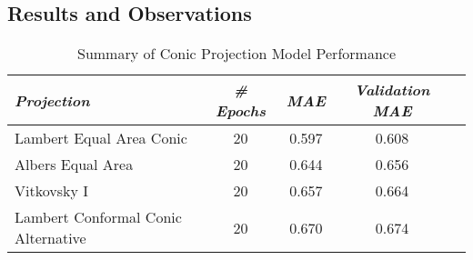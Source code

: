 
\subsection{Results and Observations}

\begin{table}[ht]
    \centering
    \caption{Summary of Conic Projection Model Performance}
    \label{conic_results_table}
    \renewcommand{\arraystretch}{1.2} %
    \begin{tabular}{|l|c|c|c|c|}
        \hline
        \rowcolor[gray]{0.9}
        \textbf{\emph{Projection}}          & \textbf{\emph{\# Epochs}} & \textbf{\emph{MAE}} & \textbf{\emph{Validation MAE}} \\ \hline
        Lambert Equal Area Conic            & 20                        & 0.597               & 0.608                          \\ \hline
        Albers Equal Area                   & 20                        & 0.644               & 0.656                          \\ \hline
        Vitkovsky I                         & 20                        & 0.657               & 0.664                          \\ \hline
        Lambert Conformal Conic Alternative & 20                        & 0.670               & 0.674                          \\ \hline
    \end{tabular}
\end{table}